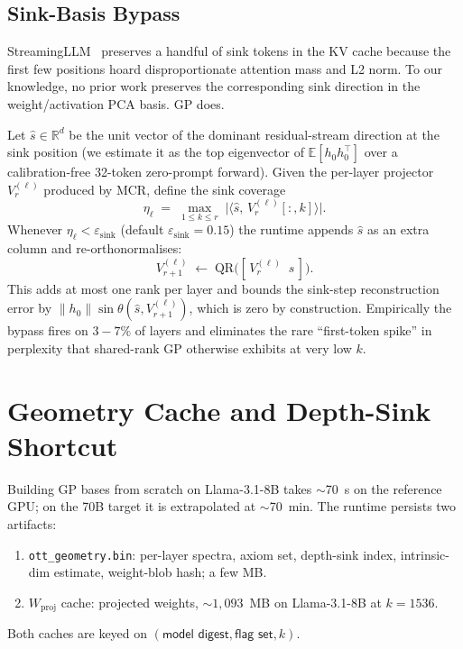 \documentclass[11pt]{article}
\begin{document}
\subsection{Sink-Basis Bypass}
\label{sec:sink-basis-bypass}
StreamingLLM~\cite{xiao2023streamingllm} preserves a handful of
sink tokens in the KV cache because the first few positions hoard
disproportionate attention mass and L2 norm.  To our knowledge, no prior
work preserves the corresponding sink direction in the
weight/activation PCA basis.  GP does.

Let $\hat s\in\mathbb{R}^d$ be the unit vector of the dominant
residual-stream direction at the sink position (we estimate it as the top
eigenvector of $\mathbb{E}[h_0 h_0^\top]$ over a calibration-free 32-token
zero-prompt forward).  Given the per-layer projector $V_{r}^{(\ell)}$
produced by MCR, define the sink coverage
\begin{equation}
\eta_\ell \;=\; \max_{1\le k\le r}\;\bigl|\langle\hat s,\,V_{r}^{(\ell)}[:,k]\rangle\bigr|.
\end{equation}
Whenever $\eta_\ell < \varepsilon_{\mathrm{sink}}$
(default $\varepsilon_{\mathrm{sink}}=0.15$) the runtime appends $\hat s$ as
an extra column and re-orthonormalises:
\begin{equation}
V_{r+1}^{(\ell)} \;\leftarrow\; \mathrm{QR}\!\bigl([\,V_{r}^{(\ell)}\;\;\hat s\,]\bigr).
\end{equation}
This adds at most one rank per layer and bounds the sink-step
reconstruction error by $\|h_0\|\sin\theta(\hat s, V_{r+1}^{(\ell)})$,
which is zero by construction.  Empirically the bypass fires on $3{-}7\%$
of layers and eliminates the rare ``first-token spike'' in perplexity
that shared-rank GP otherwise exhibits at very low $k$.

\section{Geometry Cache and Depth-Sink Shortcut}
\label{sec:cache}
Building GP bases from scratch on Llama-3.1-8B takes $\sim$70~s on the
reference GPU; on the 70B target it is extrapolated at $\sim$70~min.  The
runtime persists two artifacts:
\begin{enumerate}
\item \texttt{ott\_geometry.bin}: per-layer spectra, axiom set, depth-sink
index, intrinsic-dim estimate, weight-blob hash; a few MB.
\item $W_\text{proj}$ cache: projected weights, $\sim 1{,}093$~MB on
Llama-3.1-8B at $k{=}1536$.
\end{enumerate}
Both caches are keyed on $(\textsf{model digest},\textsf{flag set},k)$.
\end{document}
